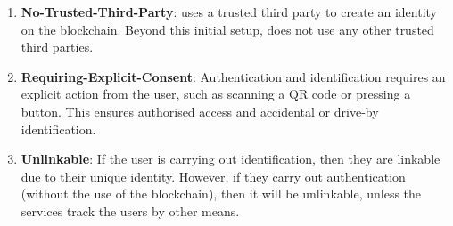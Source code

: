 \begin{enumerate}
    \item \textbf{No-Trusted-Third-Party}: \deeid uses a trusted third party to create an identity on the blockchain. Beyond this initial setup, \deeid does not use any other trusted third parties.

    \item \textbf{Requiring-Explicit-Consent}: Authentication and identification requires an explicit action from the user, such as scanning a QR code or pressing a button. This ensures authorised access and accidental or drive-by identification.

    \item \textbf{Unlinkable}: If the user is carrying out identification, then they are linkable due to their unique identity. However, if they carry out authentication (without the use of the blockchain), then it will be unlinkable, unless the services track the users by other means.
\end{enumerate}